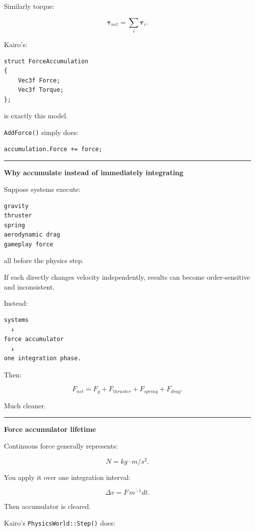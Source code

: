 Similarly torque:

\[
\boldsymbol{\tau}_{net}
=
\sum_i
\boldsymbol{\tau}_i.
\]

Kairo's:

\begin{verbatim}
struct ForceAccumulation
{
    Vec3f Force;
    Vec3f Torque;
};
\end{verbatim}

is exactly this model.

\texttt{AddForce()} simply does:

\begin{verbatim}
accumulation.Force += force;
\end{verbatim}

\begin{center}\rule{0.5\linewidth}{0.5pt}\end{center}

\textbf{Why accumulate instead of immediately integrating}

Suppose systems execute:

\begin{verbatim}
gravity
thruster
spring
aerodynamic drag
gameplay force
\end{verbatim}

all before the physics step.

If each directly changes velocity independently, results can become order-sensitive and inconsistent.

Instead:

\begin{verbatim}
systems
  ↓
force accumulator
  ↓
one integration phase.
\end{verbatim}

Then:

\[
F_{net}
=
F_g+
F_{thruster}+
F_{spring}+
F_{drag}.
\]

Much cleaner.

\begin{center}\rule{0.5\linewidth}{0.5pt}\end{center}

\textbf{Force accumulator lifetime}

Continuous force generally represents:

\[
N=kg\cdot m/s^2.
\]

You apply it over one integration interval:

\[
\Delta v=
F\,m^{-1}dt.
\]

Then accumulator is cleared.

Kairo's \texttt{PhysicsWorld::Step()} does:

